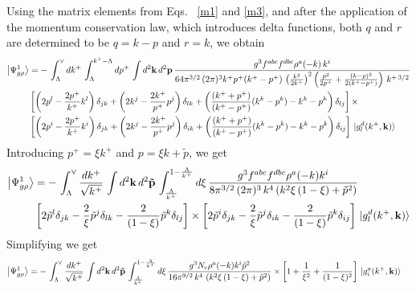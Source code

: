 \documentclass[aps,prd,amsmath,amssymb,nofootinbib]{revtex4-2}
\numberwithin{equation}{section}
\begin{document}
Using the matrix elements from Eqs.~ \eqref{m1} and \eqref{m3}, and after the application of the momentum conservation law, which introduces delta functions, both $q$ and $r$ are determined to be $q = k-p$ and $r=k$, we obtain 
\begin{align}
    \left|\Psi_{g\rho}^{1}\right\rangle & = -\, \int_{\Lambda}^{\vee} dk^{+}\, \int_{\Lambda}^{k^{+}-\Lambda} dp^{+}\, \int d^{2}\mathbf{k}\, d^{2}\mathbf{p}\,\frac{g^{3}f^{abc}f^{dbc}\rho^{a}(-k)\,k^{i}}{64\pi^{3/2}\,(2\pi)^{3}k^{+}p^{+}(k^{+}-p^{+})\,\left(\frac{k^{2}}{2k^{+}}\right)^{2}\left(\frac{p^{2}}{2p^{+}}+\frac{(k-p)^{2}}{2(k^{+}-p^{+})}\right)\,k^{+\,3/2}}\notag \\ & \left[\left(2p^{l}-\frac{2p^{+}}{k^{+}}k^{l}\right)\delta_{jk}+\left(2k^{j}-\frac{2k^{+}}{p^{+}} p^{j}\right)\delta_{lk}+\left(\frac{(k^{+}+p^{+})}{(k^{+}-p^{+})}(k^{k}-p^{k})-k^{k}-p^{k}\right)\delta_{lj}\right]\times \notag \\ & \left[\left(2p^{i}-\frac{2p^{+}}{k^{+}}k^{i}\right)\delta_{jk}+\left(2k^{j}-\frac{2k^{+}}{p^{+}} p^{j}\right)\delta_{ik}+\left(\frac{(k^{+}+p^{+})}{(k^{+}-p^{+})}(k^{k}-p^{k})-k^{k}-p^{k}\right)\delta_{ij}\right]\, \ket{g^{d}_{l}(k^{+},\mathbf{k})}
\end{align}
Introducing $p^{+} = \xi k^{+}$ and $p = \xi k +\tilde{p}$, we get
\begin{align}
    \left|\Psi_{g\rho}^{1}\right\rangle & = -\, \int_{\Lambda}^{\vee} \frac{dk^{+}}{\sqrt{k^{+}}}\,\int d^{2}\mathbf{k}\, d^{2}\mathbf{\tilde{p}}\, \int_{\frac{\Lambda}{k^{+}}}^{1-\frac{\Lambda}{k^{+}}} d\xi\, \frac{g^{3}f^{abc}f^{dbc}\rho^{a}(-k)k^{i}}{8\pi^{3/2}\,(2\pi)^{3}\,k^{4}\left(k^{2}\xi\,(1-\xi)+\tilde{p}^{2}\right)}\notag \\ & \left[2\tilde{p}^{l}\delta_{jk}-\frac{2}{\xi}\tilde{p}^{j}\delta_{lk}-\frac{2}{(1-\xi)}\tilde{p}^{k}\delta_{lj}\right] \times \left[2\tilde{p}^{i}\delta_{jk}-\frac{2}{\xi}\tilde{p}^{j}\delta_{ik}-\frac{2}{(1-\xi)}\tilde{p}^{k}\delta_{ij}\right]\, \ket{g^{d}_{l}(k^{+},\mathbf{k})}
\end{align}
Simplifying we get
\begin{align}
     \left|\Psi_{g\rho}^{1}\right\rangle & = -\, \int_{\Lambda}^{\vee} \frac{dk^{+}}{\sqrt{k^{+}}}\,\int d^{2}\mathbf{k}\, d^{2}\mathbf{\tilde{p}}\, \int_{\frac{\Lambda}{k^{+}}}^{1-\frac{\Lambda}{k^{+}}} d\xi\, \frac{g^{3}N_{c}\rho^{a}(-k)k^{i}\tilde{p}^{2}}{16\pi^{9/2}\, k^{4}\,\left(k^{2}\xi\,(1-\xi)+\tilde{p}^{2}\right)}\times \left[1+\frac{1}{\xi^{2}}+\frac{1}{(1-\xi)^{2}}\right]\,\ket{g^{a}_{i}(k^{+},\mathbf{k})}
\end{align}
\end{document}
